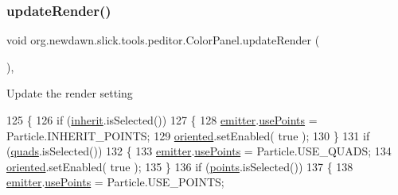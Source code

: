 \subsubsection{\texorpdfstring{update\+Render()}{updateRender()}}
{\footnotesize\ttfamily void org.\+newdawn.\+slick.\+tools.\+peditor.\+Color\+Panel.\+update\+Render (\begin{DoxyParamCaption}{ }\end{DoxyParamCaption})\hspace{0.3cm}{\ttfamily [inline]}, {\ttfamily [private]}}

Update the render setting 
\begin{DoxyCode}
125                                 \{
126         \textcolor{keywordflow}{if} (\mbox{\hyperlink{classorg_1_1newdawn_1_1slick_1_1tools_1_1peditor_1_1_color_panel_ae0b2c9e5d4fbdd2075719fb5157ad535}{inherit}}.isSelected())
127         \{
128             \mbox{\hyperlink{classorg_1_1newdawn_1_1slick_1_1tools_1_1peditor_1_1_control_panel_aaa170169fa574cb6b271f782afcd2517}{emitter}}.\mbox{\hyperlink{classorg_1_1newdawn_1_1slick_1_1particles_1_1_configurable_emitter_a70dbcb61667c957161a8c99b3fd563d6}{usePoints}} = Particle.INHERIT\_POINTS;
129             \mbox{\hyperlink{classorg_1_1newdawn_1_1slick_1_1tools_1_1peditor_1_1_color_panel_a6533414e865f5347e1ddfd2b63ed1e3c}{oriented}}.setEnabled( \textcolor{keyword}{true} );
130         \}
131         \textcolor{keywordflow}{if} (\mbox{\hyperlink{classorg_1_1newdawn_1_1slick_1_1tools_1_1peditor_1_1_color_panel_abf4fa6b876032e7606447f1c87fdd7ca}{quads}}.isSelected())
132         \{
133             \mbox{\hyperlink{classorg_1_1newdawn_1_1slick_1_1tools_1_1peditor_1_1_control_panel_aaa170169fa574cb6b271f782afcd2517}{emitter}}.\mbox{\hyperlink{classorg_1_1newdawn_1_1slick_1_1particles_1_1_configurable_emitter_a70dbcb61667c957161a8c99b3fd563d6}{usePoints}} = Particle.USE\_QUADS;
134             \mbox{\hyperlink{classorg_1_1newdawn_1_1slick_1_1tools_1_1peditor_1_1_color_panel_a6533414e865f5347e1ddfd2b63ed1e3c}{oriented}}.setEnabled( \textcolor{keyword}{true} );
135         \}
136         \textcolor{keywordflow}{if} (\mbox{\hyperlink{classorg_1_1newdawn_1_1slick_1_1tools_1_1peditor_1_1_color_panel_a19fbea7cce8d6204b3f2a9f82832b51a}{points}}.isSelected())
137         \{
138             \mbox{\hyperlink{classorg_1_1newdawn_1_1slick_1_1tools_1_1peditor_1_1_control_panel_aaa170169fa574cb6b271f782afcd2517}{emitter}}.\mbox{\hyperlink{classorg_1_1newdawn_1_1slick_1_1particles_1_1_configurable_emitter_a70dbcb61667c957161a8c99b3fd563d6}{usePoints}} = Particle.USE\_POINTS;

\end{DoxyCode}

